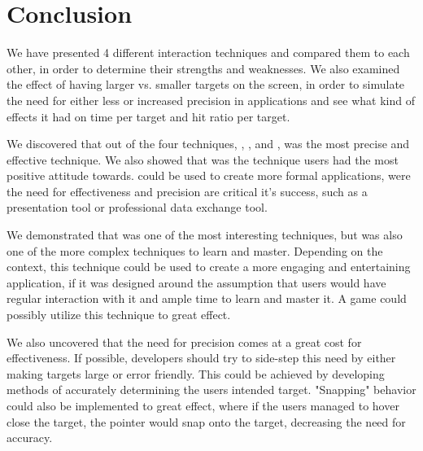 \section{Conclusion}
We have presented 4 different interaction techniques and compared them to each other, in order to determine their strengths and weaknesses.
We also examined the effect of having larger vs. smaller targets on the screen, in order to simulate the need for either less or increased precision in applications and see what kind of effects it had on time per target and hit ratio per target. 

We discovered that out of the four techniques, \swipe, \throw, \tilt and \pinch, \swipe was the most precise and effective technique. We also showed that \swipe was the technique users had the most positive attitude towards. 
\swipe could be used to create more formal applications, were the need for effectiveness and precision are critical it's success, such as a presentation tool or professional data exchange tool. 

We demonstrated that \pinch was one of the most interesting techniques, but was also one of the more complex techniques to learn and master. 
Depending on the context, this technique could be used to create a more engaging and entertaining application, if it was designed around the assumption that users would have regular interaction with it and ample time to learn and master it.
A game could possibly utilize this technique to great effect. 

We also uncovered that the need for precision comes at a great cost for effectiveness. 
If possible, developers should try to side-step this need by either making targets large or error friendly.
This could be achieved by developing methods of accurately determining the users intended target.
"Snapping" behavior could also be implemented to great effect, where if the users managed to hover close the target, the pointer would snap onto the target, decreasing the need for accuracy. 